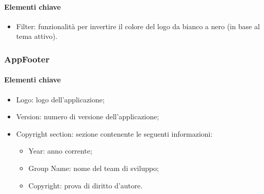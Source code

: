 \paragraph*{Elementi chiave}
\begin{itemize}
  \item Filter: funzionalità per invertire il colore del logo da bianco a nero (in base al tema attivo).
\end{itemize}

\subsubsection{AppFooter}

\paragraph*{Elementi chiave}
\begin{itemize}
  \item Logo: logo dell'applicazione;
  \item Version: numero di versione dell'applicazione;
  \item Copyright section: sezione contenente le seguenti informazioni:
  \begin{itemize}
    \item Year: anno corrente;
    \item Group Name: nome del team di sviluppo;
    \item Copyright: prova di diritto d'autore.
  \end{itemize}
\end{itemize}